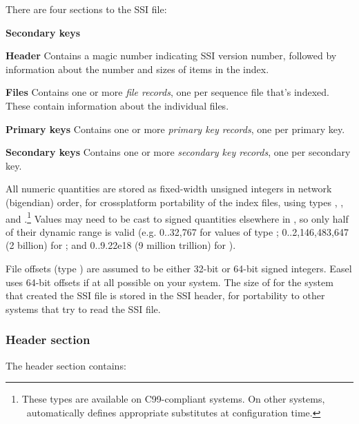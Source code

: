 There are four sections to the SSI file:
\begin{sreitems}{\textbf{Secondary keys}}
\item[\textbf{Header}] 
Contains a magic number indicating SSI version number, followed by
information about the number and sizes of items in the index.

\item[\textbf{Files}]
Contains one or more \emph{file records}, one per sequence file that's
indexed. These contain information about the individual files.

\item[\textbf{Primary keys}]
Contains one or more \emph{primary key records}, one per primary key.

\item[\textbf{Secondary keys}]
Contains one or more \emph{secondary key records}, one per secondary key.
\end{sreitems}

All numeric quantities are stored as fixed-width unsigned integers in
network (bigendian) order, for crossplatform portability of the index
files, using types , , and
.\footnote{These types are available on C99-compliant
systems. On other systems, \Easel\ automatically defines appropriate
substitutes at configuration time.}  Values may need to be cast to
signed quantities elsewhere in \Easel, so only half of their dynamic
range is valid (e.g. 0..32,767 for values of type ;
0..2,146,483,647 (2 billion) for ; and 0..9.22e18 (9
million trillion) for ).

File offsets (type ) are assumed to be either 32-bit or
64-bit signed integers. Easel uses 64-bit offsets if at all possible
on your system. The size of  for the system that created
the SSI file is stored in the SSI header, for portability to other
systems that try to read the SSI file.

\subsubsection{Header section}

The header section contains:

